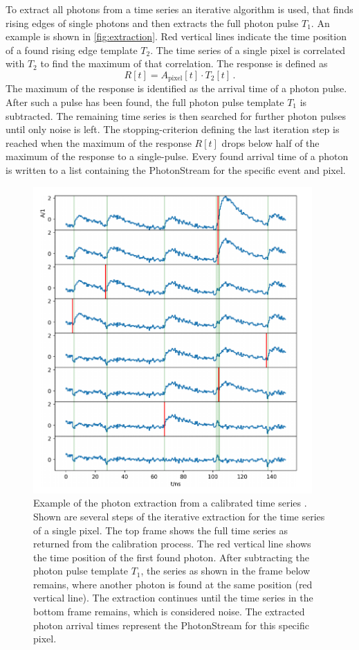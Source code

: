 To extract all photons from a time series an iterative algorithm is used, that
finds rising edges of single photons and then extracts the full photon pulse
$T_1$. An example is shown in \autoref{fig:extraction}. Red vertical lines
indicate the time position of a found rising edge template $T_2$. The time
series of a single pixel is correlated with $T_2$ to find the maximum of that
correlation. The response is defined as
%
\begin{equation}
  R[t] = A_\text{pixel}[t]\cdot T_2[t] \, .
\end{equation}
%
The maximum of the response is identified as the arrival time of a photon pulse.
After such a pulse has been found, the full photon pulse template $T_1$ is
subtracted. The remaining time series is then searched for further photon
pulses until only noise is left. The stopping-criterion defining the last
iteration step is reached when the maximum of the response $R[t]$ drops below
half of the maximum of the response to a single-pulse.
Every found arrival time of a photon is written to a list containing the
PhotonStream for the specific event and pixel.
%
\begin{figure}
  \centering
  \includegraphics[width=0.95\textwidth]{Plots/photon_extraction_sebastian.png}
  \caption{Example of the photon extraction from a calibrated time series \cite{sebastian}. Shown are several steps of the iterative extraction for the time series of a single pixel. The top frame shows the full time series as returned from the calibration process. The red vertical line shows the time position of the first found photon. After subtracting the photon pulse template $T_1$, the series as shown in the frame below remains, where another photon is found at the same position (red vertical line). The extraction continues until the time series in the bottom frame remains, which is considered noise. The extracted photon arrival times represent the PhotonStream for this specific pixel.}
  \label{fig:extraction}
\end{figure}
%
